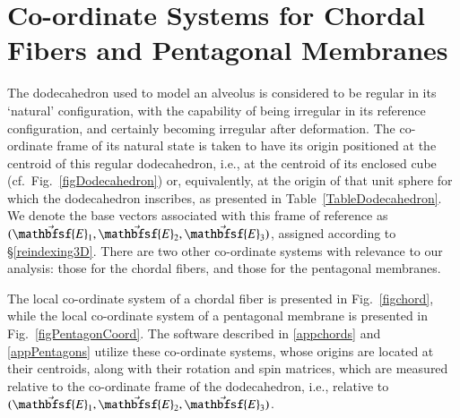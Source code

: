 \section{Co-ordinate Systems for Chordal Fibers and Pentagonal Membranes}

The dodecahedron used to model an alveolus is considered to be regular in its `natural' configuration, with the capability of being irregular in its reference configuration, and certainly becoming irregular after deformation.  The co-ordinate frame of its natural state is taken to have its origin positioned at the centroid of this regular dodecahedron, i.e., at the centroid of its enclosed cube (cf.\ Fig.~\ref{figDodecahedron}) or, equivalently, at the origin of that unit sphere for which the dodecahedron inscribes, as presented in Table~\ref{TableDodecahedron}.  We denote the base vectors associated with this frame of reference as $( \vec{\mathbfsf{E}}_1 , \vec{\mathbfsf{E}}_2 , \vec{\mathbfsf{E}}_3 )$, assigned according to \S\ref{reindexing3D}.  There are two other co-ordinate systems with relevance to our analysis: those for the chordal fibers, and those for the pentagonal membranes.

The local co-ordinate system of a chordal fiber is presented in Fig.~\ref{figchord}, while the local co-ordinate system of a pentagonal membrane is presented in Fig.~\ref{figPentagonCoord}.  The software described in \ref{appchords} and \ref{appPentagons} utilize these co-ordinate systems, whose origins are located at their centroids, along with their rotation and spin matrices, which are measured relative to the co-ordinate frame of the dodecahedron, i.e., relative to $( \vec{\mathbfsf{E}}_1 , \vec{\mathbfsf{E}}_2 , \vec{\mathbfsf{E}}_3 )$.

